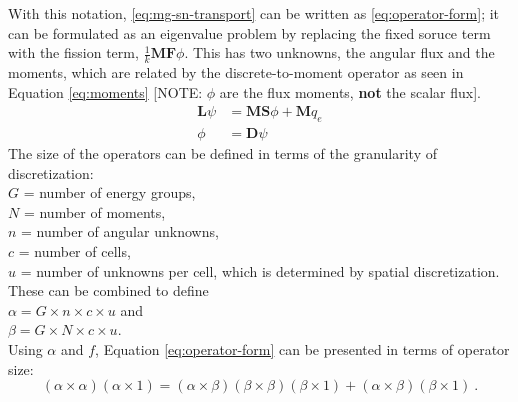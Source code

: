 \documentclass[12pt]{article}
\newcommand{\ve}[1]{\ensuremath{\mathbf{#1}}}
\begin{document}
With this notation, \autoref{eq:mg-sn-transport} can be written as \autoref{eq:operator-form}; it can be formulated as an eigenvalue problem by replacing the fixed soruce term with the fission term, $\frac{1}{k}\mathbf{MF}\phi$. This has two unknowns, the angular flux and the moments, which are related by the discrete-to-moment operator as seen in Equation \eqref{eq:moments} [NOTE: $\phi$ are the flux moments, \textbf{not} the scalar flux].
%
\begin{align}
  \mathbf{L} \psi &= \mathbf{MS}\phi + \ve{M}q_{e} \label{eq:operator-form}\\
  \phi &= \mathbf{D}\psi 
  \label{eq:moments}
\end{align}
%
The size of the operators can be defined in terms of the granularity of discretization: \\
%
\hspace*{2em} $G$ = number of energy groups, \\
\hspace*{2em} $N$ = number of moments, \\
\hspace*{2em} $n$ = number of angular unknowns, \\
\hspace*{2em} $c$ = number of cells, \\
\hspace*{2em} $u$ = number of unknowns per cell, which is determined by spatial discretization. \\
%
These can be combined to define \\
\hspace*{2em} $\alpha = G \times n \times c \times u$ and \\
\hspace*{2em} $\beta = G \times N \times c \times u$. \\
Using $\alpha$ and $f$, Equation \eqref{eq:operator-form} can be presented in terms of operator size:\\
\[
(\alpha \times \alpha)(\alpha \times 1) = (\alpha \times \beta) (\beta \times \beta) (\beta \times 1) + (\alpha \times \beta) (\beta \times 1)\:.
\]
\end{document}

